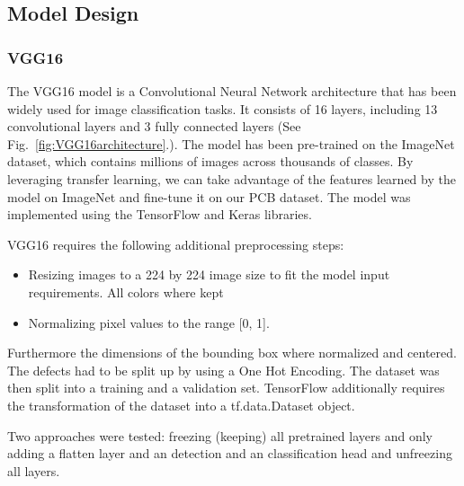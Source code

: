 \documentclass[12pt]{article}
\begin{document}
\subsection{Model Design}

\subsubsection{VGG16}

The VGG16 model is a Convolutional Neural Network architecture that has been widely used for image classification tasks. It consists of 16 layers, including 13 convolutional layers and 3 fully connected layers (See Fig.~\ref{fig:VGG16architecture}.). The model has been pre-trained on the ImageNet \cite{ConxVGG16ImageNet} dataset, which contains millions of images across thousands of classes. By leveraging transfer learning, we can take advantage of the features learned by the model on ImageNet and fine-tune it on our PCB dataset.
The model was implemented using the TensorFlow and Keras \cite{KerasAPI} libraries.  

VGG16 requires the following additional preprocessing steps: 

\begin{itemize}
    \item Resizing images to a 224 by 224 image size to fit the model input requirements. All colors where kept
    \item Normalizing pixel values to the range [0, 1].  
\end{itemize}

Furthermore the dimensions of the bounding box where normalized and centered. The defects had to be split up by using a One Hot Encoding. The dataset was then split into a training and a validation set. 
TensorFlow additionally requires the transformation of the dataset into a tf.data.Dataset object.

Two approaches were tested: freezing (keeping) all pretrained layers and only adding a flatten layer and an detection and an classification head and unfreezing all layers.
\end{document}
